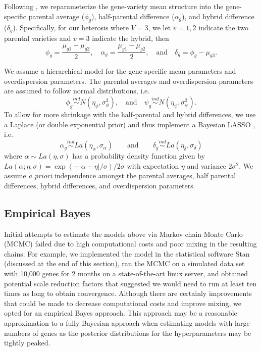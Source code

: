\documentclass[useAMS,usenatbib,referee]{biom}
\newcommand{\Stan}{Stan}
\begin{document}
Following \cite{ji2014estimation}, we reparameterize the gene-variety mean structure into the gene-specific parental average ($\phi_g$), half-parental difference ($\alpha_g$), and hybrid difference ($\delta_g$). Specifically, for our heterosis where $V=3$, we let $v=1,2$ indicate the two parental varieties and $v=3$ indicate the hybrid, then
\[ \phi_g = \frac{\mu_{g1}+\mu_{g2}}{2}, \quad 
\alpha_g = \frac{\mu_{g1}-\mu_{g2}}{2}, \quad \mbox{and} \quad
\delta_g = \phi_g-\mu_{g3}. \]

We assume a hierarchical model for the gene-specific mean parameters and overdispersion parameters. The parental averages and overdispersion parameters are assumed to follow normal distributions, i.e.
\[ 
\phi_g \stackrel{ind}{\sim} N(\eta_\phi, \sigma_\phi^2), \quad \mbox{and}\quad 
\psi_g \stackrel{ind}{\sim} N(\eta_\psi,\sigma_\psi^2). 
\]
To allow for more shrinkage with the half-parental and hybrid differences, we use a Laplace (or double exponential prior) and thus implement a Bayesian LASSO \citep{park2008bayesian}, i.e. 
\[ 
\alpha_g \stackrel{ind}{\sim} La(\eta_\alpha, \sigma_\alpha) \qquad \mbox{and} \qquad
\delta_g \stackrel{ind}{\sim} La(\eta_\delta, \sigma_\delta) 
\]
where $\alpha\sim La(\eta,\sigma)$ has a probability density function given by $La(\alpha;\eta,\sigma) = \exp(-|\alpha-\eta|/\sigma)/2\sigma$ with expectation $\eta$ and variance $2\sigma^2$. We assume \emph{a priori} independence amongst the parental averages, half parental differences, hybrid differences, and overdispersion parameters.

\subsection{Empirical Bayes}
\label{s:ebayes}

Initial attempts to estimate the models above via Markov chain Monte Carlo (MCMC) failed due to high computational costs and poor mixing in the resulting chains. For example, we implemented the model in the statistical software \Stan{} (discussed at the end of this section), ran the MCMC on a simulated data set with 10,000 genes for 2 months on a state-of-the-art linux server, and obtained potential scale reduction factors that suggested we would need to run at least ten times as long to obtain convergence. Although there are certainly improvements that could be made to decrease computational costs and improve mixing, we opted for an empirical Bayes approach. This approach may be a reasonable approximation to a fully Bayesian approach when estimating models with large numbers of genes as the posterior distributions for the hyperparameters may be tightly peaked. 
\end{document}
